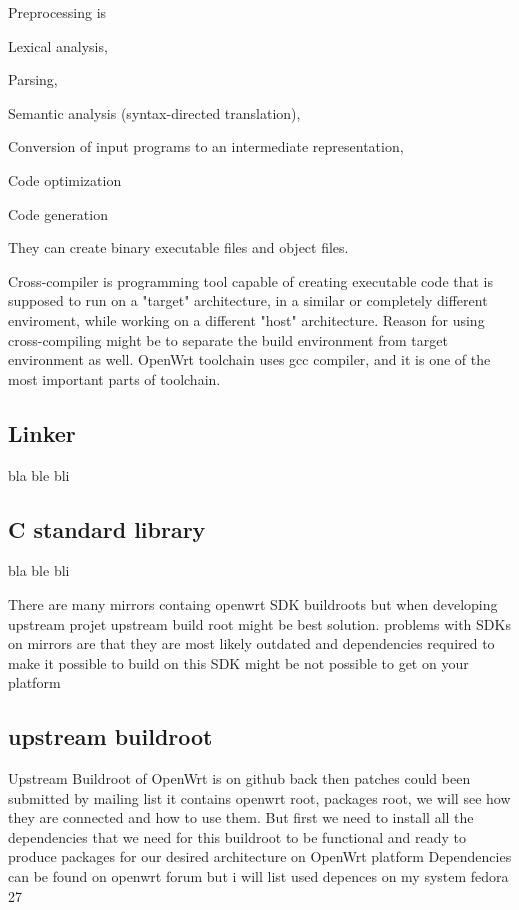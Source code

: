Preprocessing is

Lexical analysis,

Parsing,

Semantic analysis (syntax-directed translation),

Conversion of input programs to an intermediate representation,

Code optimization

Code generation

They can create binary executable files and object files.

Cross-compiler is programming tool capable of creating executable code that is supposed to run on a "target" architecture, in a similar or completely different enviroment, while working on a different "host" architecture.
Reason for using cross-compiling might be to separate the build environment from target environment as well.
OpenWrt toolchain uses gcc compiler, and it is one of the most important parts of toolchain.

\subsection{Linker}

bla ble bli

\subsection{C standard library}


bla ble bli


There are many mirrors containg openwrt SDK buildroots but when developing upstream projet upstream build root might be best solution.
problems with SDKs on mirrors are that they are most likely outdated and dependencies required to make it possible to build on this SDK might be not possible to get on your platform




\subsection{upstream buildroot}

Upstream Buildroot of OpenWrt is on github back then patches could been submitted by mailing list
it contains openwrt root, packages root, we will see how they are connected and how to use them.
But first we need to install all the dependencies that we need for this buildroot to be functional and ready to produce packages for our desired architecture on OpenWrt platform
Dependencies can be found on openwrt forum but i will list used depences on my system fedora 27

